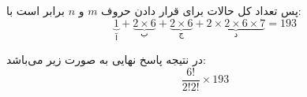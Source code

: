    \p
    پس تعداد کل حالات برای قرار دادن حروف 
    $m$ و $n$ 
     برابر است با:
    $$\underbrace{1}_{\text{آ}} + \underbrace{2\times 6}_{\text{ب}} + \underbrace{2\times 6}_{\text{ج}}+ \underbrace{2\times 2 \times 6 \times 7}_{\text{د}}‌=‌193$$
    
    \p
    در نتیجه پاسخ نهایی به صورت زیر می‌باشد:
    $$\frac{6!}{2!2!} \times 193$$
  
